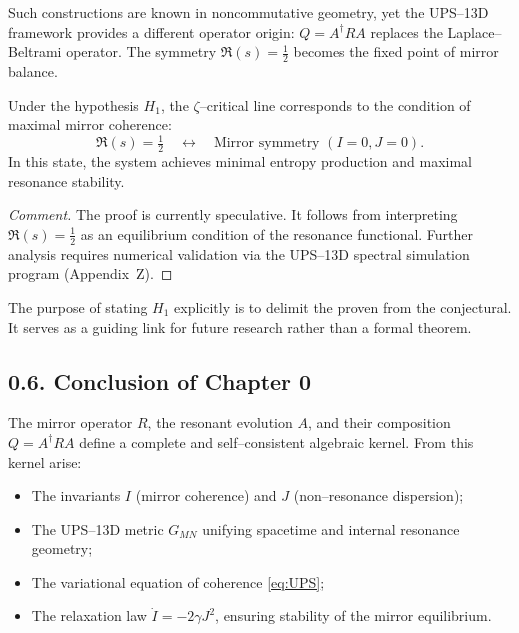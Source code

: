 \begin{remark}
Such constructions are known in noncommutative geometry, yet the UPS–13D framework provides a different operator origin:
$Q = A^\dagger R A$ replaces the Laplace–Beltrami operator.
The symmetry $\Re(s)=\frac{1}{2}$ becomes the fixed point of mirror balance.
\end{remark}

\begin{corollary}
Under the hypothesis $H_1$, the $\zeta$–critical line corresponds to the condition of maximal mirror coherence:
\[
\Re(s)=\tfrac12 \quad \leftrightarrow \quad \text{Mirror symmetry } (I=0, J=0).
\]
In this state, the system achieves minimal entropy production and maximal resonance stability.
\end{corollary}

\begin{proof}[Comment]
The proof is currently speculative.
It follows from interpreting $\Re(s)=\tfrac12$ as an equilibrium condition of the resonance functional.
Further analysis requires numerical validation via the UPS–13D spectral simulation program (Appendix~Z).
\end{proof}

\begin{remark}
The purpose of stating $H_1$ explicitly is to delimit the proven from the conjectural.
It serves as a guiding link for future research rather than a formal theorem.
\end{remark}

\subsection*{0.6. Conclusion of Chapter 0}

\noindent
The mirror operator $R$, the resonant evolution $A$, and their composition $Q=A^\dagger R A$ define a complete and self–consistent algebraic kernel.
From this kernel arise:

\begin{itemize}
\item The invariants $I$ (mirror coherence) and $J$ (non–resonance dispersion);
\item The UPS–13D metric $G_{MN}$ unifying spacetime and internal resonance geometry;
\item The variational equation of coherence \eqref{eq:UPS};
\item The relaxation law $\dot I=-2\gamma J^2$, ensuring stability of the mirror equilibrium.
\end{itemize}

